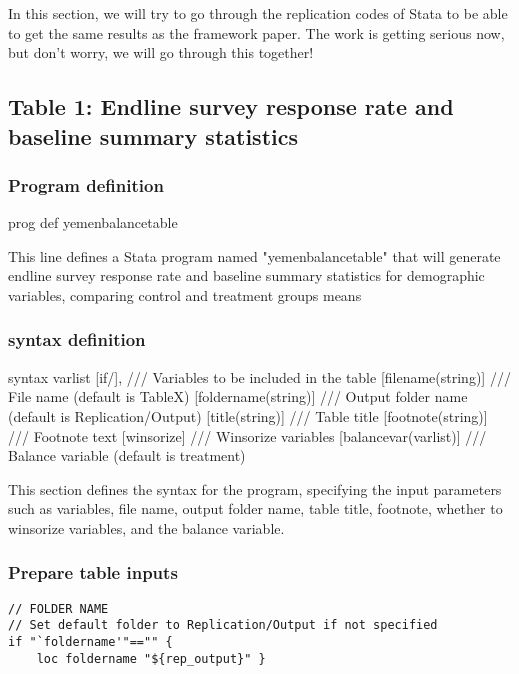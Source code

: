 \documentclass{article}
\begin{document}
In this section, we will try to go through the replication codes of Stata to be able to get the same results as the framework paper. The work is getting serious now, but don’t worry, we will go through this together!


\subsection{Table 1: Endline survey response rate and baseline summary statistics}

\subsubsection{Program definition}

\begin{mdframed}
    prog def yemenbalancetable
\end{mdframed}

This line defines a Stata program named "yemenbalancetable" that will generate endline survey response rate and baseline summary statistics for demographic variables, comparing control and treatment groups means


\subsubsection{syntax definition}

\begin{mdframed}
    syntax varlist [if/], 		/// Variables to be included in the table 
	[filename(string)] 		/// File name (default is TableX)
	[foldername(string)]	/// Output folder name (default is Replication/Output)
	[title(string)] 		/// Table title 
	[footnote(string)] 		/// Footnote text 
	[winsorize] 			/// Winsorize variables 
	[balancevar(varlist)]	/// Balance variable (default is treatment)
\end{mdframed}

This section defines the syntax for the program, specifying the input parameters such as variables, file name, output folder name, table title, footnote, whether to winsorize variables, and the balance variable.

\subsubsection{Prepare table inputs}

\begin{mdframed}
\begin{verbatim}
// FOLDER NAME 
// Set default folder to Replication/Output if not specified 
if "`foldername'"=="" {
	loc foldername "${rep_output}" }
\end{verbatim}
\end{mdframed}
\end{document}
